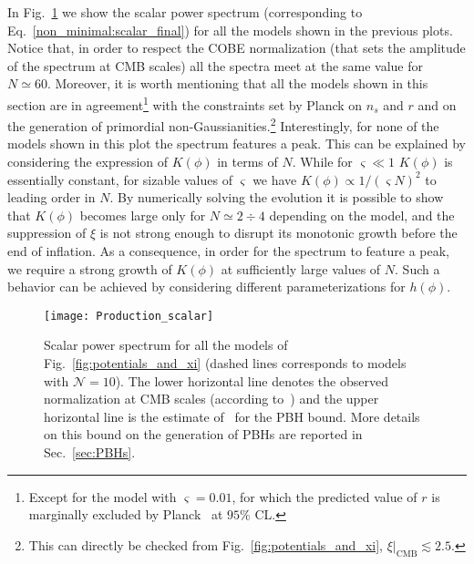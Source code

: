 In Fig.~\ref{fig:scalar} we show the scalar power spectrum (corresponding to Eq.~\eqref{non_minimal:scalar_final}) for all the models shown in the previous plots. Notice that, in order to respect the COBE normalization (that sets the amplitude of the spectrum  at CMB scales) all the spectra meet at the same value for $N\simeq 60$. Moreover, it is worth mentioning that all the models shown in this section are in agreement\footnote{Except for the model with $\varsigma = 0.01$, for which the predicted value of $r$ is marginally excluded by Planck~\cite{Ade:2015lrj} at $95\%$ CL.} with the constraints set by Planck on $n_s$ and $r$ and on the generation of primordial non-Gaussianities.\footnote{ This can directly be checked from Fig.~\ref{fig:potentials_and_xi}, $\xi|_\text{CMB} \lesssim 2.5$.} Interestingly, for none of the models shown in this plot the spectrum features a peak. This can be explained by considering the expression of $K(\phi)$ in terms of $N$. While for $\varsigma \ll 1 $ $K(\phi)$ is essentially constant, for sizable values of $\varsigma$ we have $K(\phi) \propto 1/(\varsigma N)^2$ to leading order in $N$. By numerically solving the evolution it is possible to show that $K(\phi)$ becomes large only for $N\simeq 2 \div 4 $ depending on the model, and the suppression of $\xi$ is not strong enough to disrupt its monotonic growth before the end of inflation. As a consequence, in order for the spectrum to feature a peak, we require a strong growth of $K(\phi)$ at sufficiently large values of $N$. Such a behavior can be achieved by considering different parameterizations for $h(\phi)$.


\begin{figure}
\centering
\texttt{[image: Production\_scalar]}
\caption{Scalar power spectrum for all the models of Fig.~\ref{fig:potentials_and_xi} (dashed lines corresponds to models with $\mathcal{N}=10$).
 The lower horizontal line denotes the observed normalization at CMB scales (according to~\cite{Ade:2015lrj}) and the upper horizontal line is the estimate of~\cite{Linde:2012bt} for the PBH bound. More details on this bound on the generation of PBHs are reported in Sec.~\ref{sec:PBHs}.}
\label{fig:scalar}
\end{figure}



